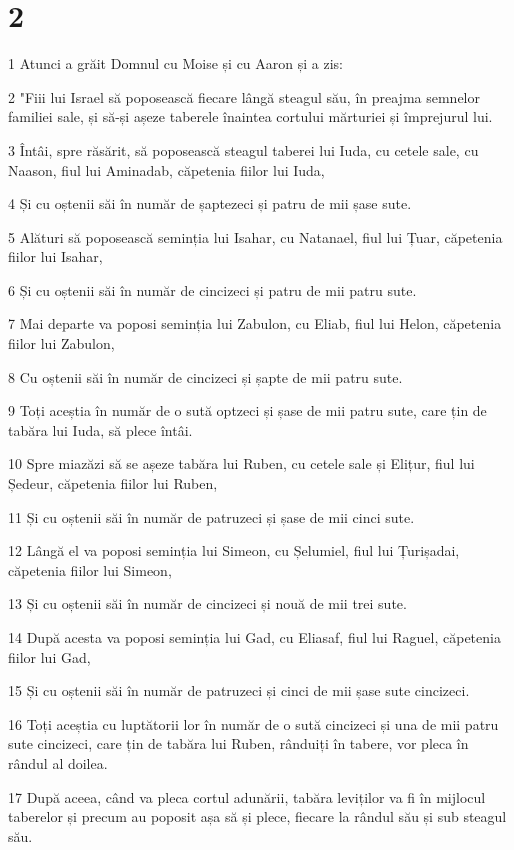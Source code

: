 \chapter{2}

\par 1 Atunci a grăit Domnul cu Moise și cu Aaron și a zis:
\par 2 "Fiii lui Israel să poposească fiecare lângă steagul său, în preajma semnelor familiei sale, și să-și așeze taberele înaintea cortului mărturiei și împrejurul lui.
\par 3 Întâi, spre răsărit, să poposească steagul taberei lui Iuda, cu cetele sale, cu Naason, fiul lui Aminadab, căpetenia fiilor lui Iuda,
\par 4 Și cu oștenii săi în număr de șaptezeci și patru de mii șase sute.
\par 5 Alături să poposească seminția lui Isahar, cu Natanael, fiul lui Țuar, căpetenia fiilor lui Isahar,
\par 6 Și cu oștenii săi în număr de cincizeci și patru de mii patru sute.
\par 7 Mai departe va poposi seminția lui Zabulon, cu Eliab, fiul lui Helon, căpetenia fiilor lui Zabulon,
\par 8 Cu oștenii săi în număr de cincizeci și șapte de mii patru sute.
\par 9 Toți aceștia în număr de o sută optzeci și șase de mii patru sute, care țin de tabăra lui Iuda, să plece întâi.
\par 10 Spre miazăzi să se așeze tabăra lui Ruben, cu cetele sale și Elițur, fiul lui Ședeur, căpetenia fiilor lui Ruben,
\par 11 Și cu oștenii săi în număr de patruzeci și șase de mii cinci sute.
\par 12 Lângă el va poposi seminția lui Simeon, cu Șelumiel, fiul lui Țurișadai, căpetenia fiilor lui Simeon,
\par 13 Și cu oștenii săi în număr de cincizeci și nouă de mii trei sute.
\par 14 După acesta va poposi seminția lui Gad, cu Eliasaf, fiul lui Raguel, căpetenia fiilor lui Gad,
\par 15 Și cu oștenii săi în număr de patruzeci și cinci de mii șase sute cincizeci.
\par 16 Toți aceștia cu luptătorii lor în număr de o sută cincizeci și una de mii patru sute cincizeci, care țin de tabăra lui Ruben, rânduiți în tabere, vor pleca în rândul al doilea.
\par 17 După aceea, când va pleca cortul adunării, tabăra leviților va fi în mijlocul taberelor și precum au poposit așa să și plece, fiecare la rândul său și sub steagul său.
